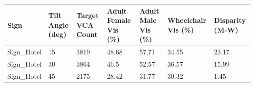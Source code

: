 \begin{tabular}{lllllll}
\hline
Sign & Tilt Angle (deg) & Target VCA Count & Adult Female Vis (\%) & Adult Male Vis (\%) & Wheelchair Vis (\%) & Disparity (M-W) \\ \hline
Sign\_Hotel & 15 & 3819 & 48.68 & 57.71 & 34.55 & 23.17 \\
Sign\_Hotel & 30 & 3864 & 46.5 & 52.57 & 36.57 & 15.99 \\
Sign\_Hotel & 45 & 2175 & 28.42 & 31.77 & 30.32 & 1.45 \\
\hline
\end{tabular}
